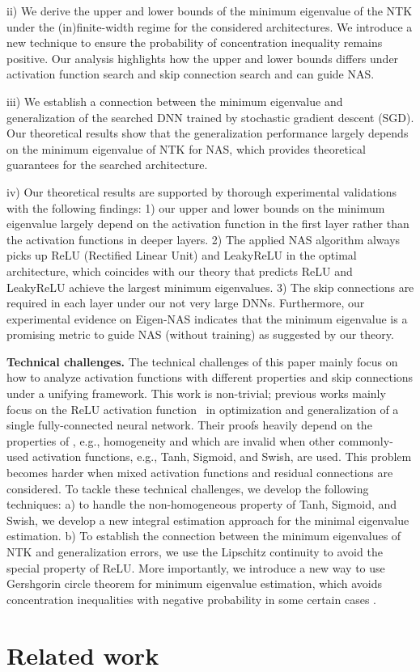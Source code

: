 \documentclass[nohyperref]{article}
\theoremstyle{plain}
\theoremstyle{definition}
\theoremstyle{remark}
\begin{document}
ii) We derive the upper and lower bounds of the minimum eigenvalue of the NTK under the (in)finite-width regime for the considered architectures. We introduce a new technique to ensure the probability of concentration inequality remains positive. Our analysis highlights how the upper and lower bounds differs under activation function search and skip connection search and can guide NAS. 

iii) We establish a connection between the minimum eigenvalue and generalization of the searched DNN trained by stochastic gradient descent (SGD). Our theoretical results show that the generalization performance largely depends on the minimum eigenvalue of NTK for NAS, which provides theoretical guarantees for the searched architecture.




iv) Our theoretical results are supported by thorough experimental validations with the following findings: 1) our upper and lower bounds on the minimum eigenvalue largely depend on the activation function in the first layer rather than the activation functions in deeper layers. 2) The applied NAS algorithm always picks up ReLU (Rectified Linear Unit) and LeakyReLU in the optimal architecture, which coincides with our theory that predicts ReLU and LeakyReLU achieve the largest minimum eigenvalues. 3) The skip connections are required in each layer under our not very large DNNs. Furthermore, our experimental evidence on Eigen-NAS indicates that the minimum eigenvalue is a promising metric to guide NAS (without training) as suggested by our theory. 




{\bf Technical challenges.} 
The technical challenges of this paper mainly focus on how to analyze activation functions with different properties and skip connections under a unifying framework. This work is non-trivial; previous works mainly focus on the ReLU activation function~\citep{pmlr-v139-nguyen21g, cao2019generalization, pmlr-v97-allen-zhu19a} in optimization and generalization of a single fully-connected neural network. Their proofs heavily depend on the properties of , e.g., homogeneity and  which are invalid when other commonly-used activation functions, e.g., Tanh, Sigmoid, and Swish, are used. 
This problem becomes harder when mixed activation functions and residual connections are considered.
To tackle these technical challenges, we develop the following techniques: a) to handle the non-homogeneous property of Tanh, Sigmoid, and Swish, we develop a new integral estimation approach for the minimal eigenvalue estimation. b) To establish the connection between the minimum eigenvalues of NTK and generalization errors, we use the Lipschitz continuity to avoid the special property of ReLU.
More importantly, we introduce a new way to use Gershgorin circle theorem for minimum eigenvalue estimation, which avoids concentration inequalities with negative probability in some certain cases \citep{pmlr-v139-nguyen21g}. \section{Related work}
\label{sec:related_work}
\end{document}
